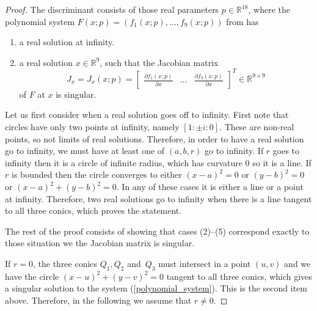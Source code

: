 \documentclass[12pt]{amsart}
\theoremstyle{definition}
\theoremstyle{definition}
\numberwithin{equation}{section}
\begin{document}
\begin{proof}

The discriminant consists of those real parameters $p\in\mathbb R^{18}$, where the polynomial system $F(x;p)=(f_1(x;p),\ldots,f_9(x;p))$ from  has
\begin{enumerate}
\item a real solution at infinity.
\item a real solution $x\in \mathbb R^{9}$, such that the Jacobian matrix $$J_x=J_x(x;p)=\begin{bmatrix}\frac{\partial f_1(x;p)}{\partial x}& \ldots & \frac{\partial f_9(x;p)}{\partial x}\end{bmatrix}^T\in\mathbb R^{9\times 9}$$ of $F$ at $x$ is singular.
\end{enumerate} 

Let us first consider when a real solution goes off to infinity. First note that circles have only two points at infinity, namely $[ 1 : \pm i : 0 ]$. These are non-real points, so not limits of real solutions. Therefore, in order to have a real solution go to infinity, we must have at least one of $(a,b,r)$ go to infinity. If $r$ goes to infinity then it is a circle of infinite radius, which has curvature $0$ so it is a line. If $r$ is bounded then the circle converges to either $(x-a)^2 = 0$ or $(y-b)^2 = 0$ or $(x-a)^2 + (y-b)^2 = 0$. In any of these cases it is either a line or a point at infinity. Therefore, two real solutions go to infinity when there is a line tangent to all three conics, which proves the statement.

The rest of the proof consists of showing that cases (2)--(5) correspond exactly to those situation we the Jacobian matrix is singular.

If $r=0$, the three conics $Q_1,Q_2$ and~$Q_3$ must intersect in a point $(u,v)$ and we have the circle $(x-u)^2 + (y-v)^2 = 0$ tangent to all three conics, which gives a singular solution to the system (\ref{polynomial_system}). This is the second item above. Therefore, in the following we assume that $r\neq  0$.


\end{proof}
\end{document}
